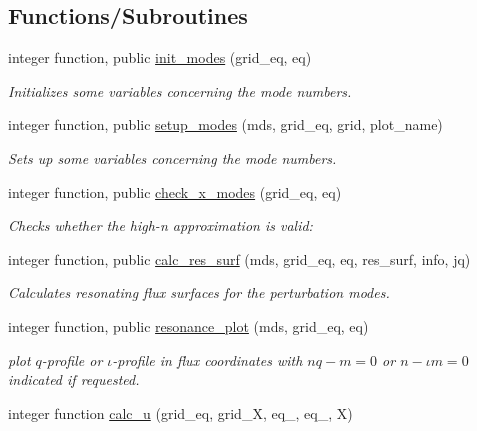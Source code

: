 \subsection*{Functions/\+Subroutines}
\begin{DoxyCompactItemize}
\item 
integer function, public \hyperlink{namespacex__ops_a73a80c582379669f8e07b09dd7456878}{init\+\_\+modes} (grid\+\_\+eq, eq)
\begin{DoxyCompactList}\small\item\em Initializes some variables concerning the mode numbers. \end{DoxyCompactList}\item 
integer function, public \hyperlink{namespacex__ops_a640d64aeae8a574eb05f164c1bdad3bd}{setup\+\_\+modes} (mds, grid\+\_\+eq, grid, plot\+\_\+name)
\begin{DoxyCompactList}\small\item\em Sets up some variables concerning the mode numbers. \end{DoxyCompactList}\item 
integer function, public \hyperlink{namespacex__ops_a7d9275e2d927d92548416f21b983b604}{check\+\_\+x\+\_\+modes} (grid\+\_\+eq, eq)
\begin{DoxyCompactList}\small\item\em Checks whether the high-\/n approximation is valid\+: \end{DoxyCompactList}\item 
integer function, public \hyperlink{namespacex__ops_a1a90026bbbeddc25e82cfdd304df251f}{calc\+\_\+res\+\_\+surf} (mds, grid\+\_\+eq, eq, res\+\_\+surf, info, jq)
\begin{DoxyCompactList}\small\item\em Calculates resonating flux surfaces for the perturbation modes. \end{DoxyCompactList}\item 
integer function, public \hyperlink{namespacex__ops_abdaf1308e13cede3a153e8c6cf35a637}{resonance\+\_\+plot} (mds, grid\+\_\+eq, eq)
\begin{DoxyCompactList}\small\item\em plot $q$-\/profile or $\iota$-\/profile in flux coordinates with $nq-m = 0$ or $n-\iota m = 0$ indicated if requested. \end{DoxyCompactList}\item 
integer function \hyperlink{namespacex__ops_a4e39701da15ff952add5133db1897b52}{calc\+\_\+u} (grid\+\_\+eq, grid\+\_\+X, eq\+\_, eq\+\_, X)

\end{DoxyCompactItemize}
